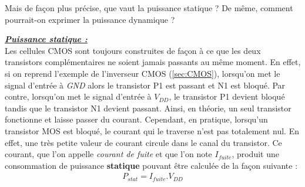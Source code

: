\documentclass[oneside]{book}
\begin{document}
Mais de façon plus précise, que vaut la puissance statique ? De même, comment pourrait-on exprimer la puissance dynamique ? 

\hspace{-0.5 cm}\underline{\textbf{\textit{Puissance statique :}}} \vspace{0.2 cm} \\
Les cellules CMOS sont toujours construites de façon à ce que les deux transistors complémentaires ne soient jamais passants au même moment. En effet, si on reprend l'exemple de l'inverseur CMOS (\ref{sec:CMOS}), lorsqu'on met le signal d'entrée à \textit{GND} alors le transistor P1 est passant et N1 est bloqué. Par contre, lorsqu'on met le signal d'entrée à \textit{$V_{DD}$}, le transistor P1 devient bloqué tandis que le transistor N1 devient passant. Ainsi, en théorie, un seul transistor fonctionne et laisse passer du courant. Cependant, en pratique, lorsqu'un transistor MOS est bloqué, le courant qui le traverse n'est pas totalement nul. En effet, une très petite valeur de courant circule dans le canal du transistor. Ce courant, que l'on appelle \textit{courant de fuite} et que l'on note \textit{$I_{fuite}$}, produit une consommation de puissance \textbf{statique} pouvant être calculée de la façon suivante :
\begin{gather}
	P_{stat} = I_{fuite} . V_{DD}
\end{gather}
\end{document}
